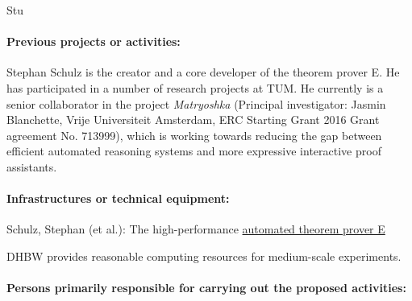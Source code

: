 \begin{sitedescription}{Stu}
\paragraph*{Previous projects or activities:}

\begin{compactitem}
\item Stephan Schulz is the creator and a core developer of the
  theorem prover E.  He has participated in a number of research
  projects at TUM. He currently is a senior collaborator in the
  project \emph{Matryoshka} (Principal investigator: Jasmin
  Blanchette, Vrije Universiteit Amsterdam, ERC Starting Grant 2016
  Grant agreement No. 713999), which is working towards reducing the
  gap between efficient automated reasoning systems and more
  expressive interactive proof assistants.
\end{compactitem}

\paragraph*{Infrastructures or technical equipment:}

\begin{compactitem}
\item Schulz, Stephan (et al.): The high-performance
  \href{https://www.eprover.org}{automated theorem prover E}
\item DHBW provides reasonable computing resources for medium-scale
  experiments.
\end{compactitem}




\paragraph*{Persons primarily responsible for carrying out the proposed activities:}


\end{sitedescription}
